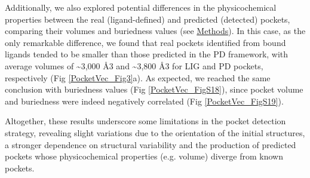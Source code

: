 Additionally, we also explored potential differences in the physicochemical properties between the real (ligand-defined) and predicted (detected) pockets, comparing their volumes and buriedness values (see \hyperref[PocketVec_Methods]{Methods}). In this case, as the only remarkable difference, we found that real pockets identified from bound ligands tended to be smaller than those predicted in the PD framework, with average volumes of \textasciitilde3,000 Å3 and \textasciitilde3,800 Å3 for LIG and PD pockets, respectively (Fig \ref{PocketVec_Fig3}a). As expected, we reached the same conclusion with buriedness values (Fig \ref{PocketVec_FigS18}), since pocket volume and buriedness were indeed negatively correlated (Fig \ref{PocketVec_FigS19}).

Altogether, these results underscore some limitations in the pocket detection strategy, revealing slight variations due to the orientation of the initial structures, a stronger dependence on structural variability and the production of predicted pockets whose physicochemical properties (e.g. volume) diverge from known pockets. 



